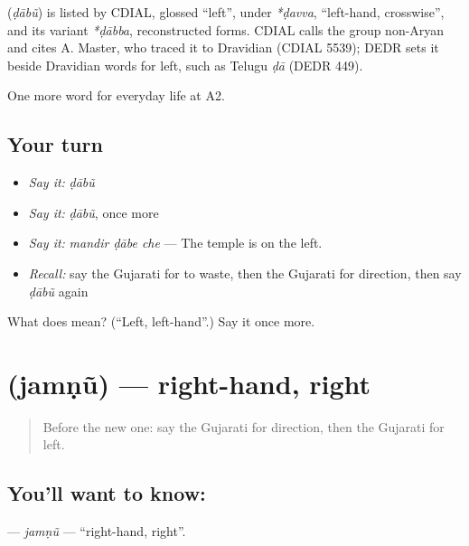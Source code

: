 \begin{cousinweb}
\textbf{} (\emph{ḍābũ}) is listed by CDIAL, glossed \textquotedblleft{}left\textquotedblright{}, under \emph{*ḍavva}, \textquotedblleft{}left-hand, crosswise\textquotedblright{}, and its variant \emph{*ḍābba}, reconstructed forms. CDIAL calls the group non-Aryan and cites A. Master, who traced it to Dravidian (CDIAL 5539); DEDR sets it beside Dravidian words for left, such as Telugu \emph{ḍā} (DEDR 449).
\end{cousinweb}

\begin{grammarlens}[title={What you've built}]
One more word for everyday life at A2.
\end{grammarlens}

\subsection*{Your turn}
\begin{itemize}
\raggedright
  \item \emph{Say it:} \emph{ḍābũ}
  \item \emph{Say it:} \emph{ḍābũ}, once more
  \item \emph{Say it:} \emph{mandir ḍābe che} — The temple is on the left.
  \item \emph{Recall:} say the Gujarati for to waste, then the Gujarati for direction, then say \emph{ḍābũ} again
\end{itemize}

\begin{tcolorbox}[breakable,colback=teal!4,colframe=teal!35!black,title={Before you move on}]
What does  mean? (\textquotedblleft{}Left, left-hand\textquotedblright{}.) Say it once more.
\end{tcolorbox}
\section[\texorpdfstring{\gu{જમણું} (jamṇũ)}{જમણું (jamṇũ)}]{ (jamṇũ) — right-hand, right}

\label{lesson:GU-C193-jamnu}



\begin{quote}
Before the new one: say the Gujarati for direction, then the Gujarati for left.
\end{quote}

\subsection*{You'll want to know: }
\textbf{} — \emph{jamṇũ} — \textquotedblleft{}right-hand, right\textquotedblright{}.

